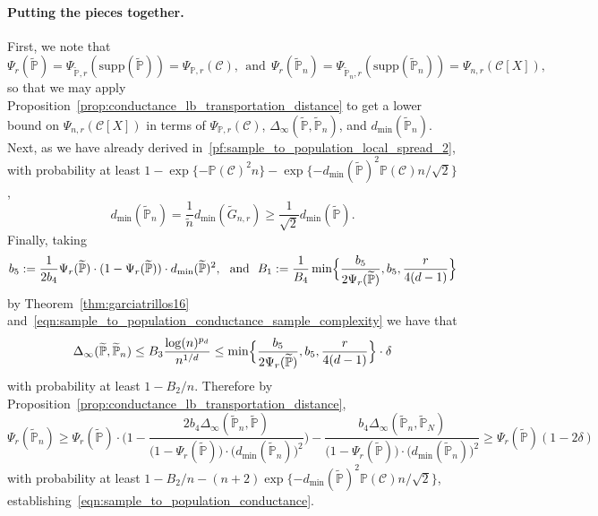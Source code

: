 \documentclass{article}
\newcommand{\1}{\mathbf{1}}
\newcommand{\mc}[1]{\mathcal{#1}}
\newcommand{\mbb}[1]{\mathbb{#1}}
\newcommand{\Pbb}{\mathbb{P}}
\newcommand{\wt}[1]{\widetilde{#1}}
\theoremstyle{definition}
\theoremstyle{remark}
\begin{document}
\paragraph{Putting the pieces together.} 
First, we note that
\begin{equation*}
\Psi_r(\wt{\mbb{P}}) = \Psi_{\wt{\mbb{P}},r}(\mathrm{supp}(\wt{\mbb{P}})) = \Psi_{\Pbb,r}(\mc{C}), ~~\textrm{and}~~\Psi_{r}(\wt{\mbb{P}}_n) = \Psi_{\wt{\mbb{P}}_n, r}(\mathrm{supp}(\wt{\mbb{P}}_n)) = \Psi_{n,r}(\mc{C}[X]),
\end{equation*}
so that we may apply Proposition~\ref{prop:conductance_lb_transportation_distance} to get a lower bound on $\Psi_{n,r}(\mc{C}[X])$ in terms of $\Psi_{\Pbb,r}(\mc{C})$, $\Delta_{\infty}(\wt{\Pbb}, \wt{\Pbb}_n)$, and $d_{\min}(\wt{\Pbb}_{n})$. Next, as we have already derived in~\eqref{pf:sample_to_population_local_spread_2}, with probability at least $1 - \exp\{-\mbb{P}(\mc{C})^2n\} - \exp\{-d_{\min}(\wt{\Pbb})^2 \Pbb(\mc{C}) n/\sqrt{2}\}$,
\begin{equation*}
d_{\min}(\wt{\Pbb}_n) = \frac{1}{\wt{n}} d_{\min}(\wt{G}_{n,r}) \geq \frac{1}{\sqrt{2}} d_{\min}(\wt{\Pbb}).
\end{equation*}
Finally, taking
\begin{equation*}
b_5 := \frac{1}{2b_4}\Psi_r(\wt{\Pbb}) \cdot (1 - \Psi_r(\wt{\Pbb})) \cdot d_{\min}(\wt{\Pbb})^2,~~\textrm{and}~~ B_1 := \frac{1}{B_4}\min\Bigl\{\frac{b_5}{2\Psi_r(\wt{\Pbb})}, b_5, \frac{r}{4(d - 1)} \Bigr\} 
\end{equation*}
by Theorem~\ref{thm:garciatrillos16} and~\eqref{eqn:sample_to_population_conductance_sample_complexity} we have that
\begin{equation*}
\Delta_{\infty}(\wt{\Pbb},\wt{\Pbb}_n) \leq B_3 \frac{\log(n)^{p_d}}{n^{1/d}} \leq \min\Bigl\{\frac{b_5}{2\Psi_r(\wt{\Pbb})}, b_5, \frac{r}{4(d - 1)} \Bigr\} \cdot \delta
\end{equation*}
with probability at least $1 - B_2/n$. Therefore by Proposition~\ref{prop:conductance_lb_transportation_distance},
\begin{equation*}
\Psi_r(\wt{\Pbb}_n) \geq \Psi_r(\wt{\Pbb}) \cdot \biggl(1 - \frac{2b_4\Delta_{\infty}(\wt{\Pbb}_n,\wt{\Pbb})}{\bigl(1 - \Psi_r(\wt{\Pbb})\bigr) \cdot \bigl(d_{\min}(\wt{\Pbb}_n)\bigr)^2}\biggr) - \frac{b_4 \Delta_{\infty}(\wt{\Pbb}_n,\wt{\Pbb}_N)}{\bigl(1 - \Psi_r(\wt{\Pbb})\bigr) \cdot \bigl(d_{\min}(\wt{\Pbb}_n)\bigr)^2} \geq \Psi_r(\wt{\Pbb}) (1 - 2\delta)
\end{equation*}
with probability at least $1 - B_2/n - (n + 2)\exp\{-d_{\min}(\wt{\Pbb})^2 \Pbb(\mc{C}) n/\sqrt{2}\}$, establishing~\eqref{eqn:sample_to_population_conductance}.
\end{document}
